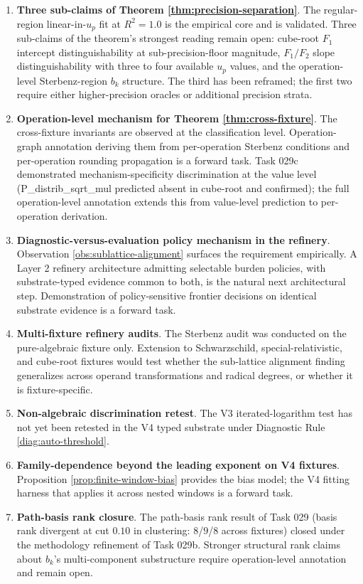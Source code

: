 \documentclass[11pt,a4paper]{article}
\begin{document}
\begin{enumerate}
    \item \textbf{Three sub-claims of Theorem \ref{thm:precision-separation}}. The regular-region linear-in-$u_p$ fit at $R^2 = 1.0$ is the empirical core and is validated. Three sub-claims of the theorem's strongest reading remain open: cube-root $F_1$ intercept distinguishability at sub-precision-floor magnitude, $F_1/F_2$ slope distinguishability with three to four available $u_p$ values, and the operation-level Sterbenz-region $b_k$ structure. The third has been reframed; the first two require either higher-precision oracles or additional precision strata.
    \item \textbf{Operation-level mechanism for Theorem \ref{thm:cross-fixture}}. The cross-fixture invariants are observed at the classification level. Operation-graph annotation deriving them from per-operation Sterbenz conditions and per-operation rounding propagation is a forward task. Task 029c demonstrated mechanism-specificity discrimination at the value level (P\_distrib\_sqrt\_mul predicted absent in cube-root and confirmed); the full operation-level annotation extends this from value-level prediction to per-operation derivation.
    \item \textbf{Diagnostic-versus-evaluation policy mechanism in the refinery}. Observation \ref{obs:sublattice-alignment} surfaces the requirement empirically. A Layer 2 refinery architecture admitting selectable burden policies, with substrate-typed evidence common to both, is the natural next architectural step. Demonstration of policy-sensitive frontier decisions on identical substrate evidence is a forward task.
    \item \textbf{Multi-fixture refinery audits}. The Sterbenz audit was conducted on the pure-algebraic fixture only. Extension to Schwarzschild, special-relativistic, and cube-root fixtures would test whether the sub-lattice alignment finding generalizes across operand transformations and radical degrees, or whether it is fixture-specific.
    \item \textbf{Non-algebraic discrimination retest}. The V3 iterated-logarithm test has not yet been retested in the V4 typed substrate under Diagnostic Rule \ref{diag:auto-threshold}.
    \item \textbf{Family-dependence beyond the leading exponent on V4 fixtures}. Proposition \ref{prop:finite-window-bias} provides the bias model; the V4 fitting harness that applies it across nested windows is a forward task.
    \item \textbf{Path-basis rank closure}. The path-basis rank result of Task 029 (basis rank divergent at cut $0.10$ in clustering: $8$/$9$/$8$ across fixtures) closed under the methodology refinement of Task 029b. Stronger structural rank claims about $b_k$'s multi-component substructure require operation-level annotation and remain open.
\end{enumerate}
\end{document}
